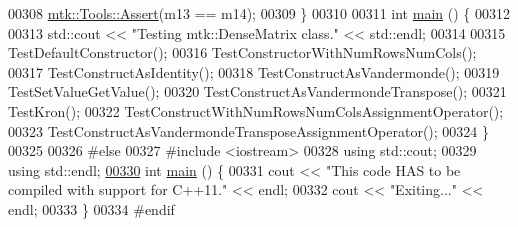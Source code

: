 \begin{DoxyCode}
00308   \hyperlink{classmtk_1_1Tools_ac6804df469c94ab6a796fb64f1e44a89}{mtk::Tools::Assert}(m13 == m14);
00309 \}
00310 
00311 \textcolor{keywordtype}{int} \hyperlink{mtk__dense__matrix__test_8cc_ae66f6b31b5ad750f1fe042a706a4e3d4}{main} () \{
00312 
00313   std::cout << \textcolor{stringliteral}{"Testing mtk::DenseMatrix class."} << std::endl;
00314 
00315   TestDefaultConstructor();
00316   TestConstructorWithNumRowsNumCols();
00317   TestConstructAsIdentity();
00318   TestConstructAsVandermonde();
00319   TestSetValueGetValue();
00320   TestConstructAsVandermondeTranspose();
00321   TestKron();
00322   TestConstructWithNumRowsNumColsAssignmentOperator();
00323   TestConstructAsVandermondeTransposeAssignmentOperator();
00324 \}
00325 
00326 \textcolor{preprocessor}{#else}
00327 \textcolor{preprocessor}{#include <iostream>}
00328 \textcolor{keyword}{using} std::cout;
00329 \textcolor{keyword}{using} std::endl;
\hypertarget{mtk__dense__matrix__test_8cc_source_l00330}{}\hyperlink{mtk__dense__matrix__test_8cc_ae66f6b31b5ad750f1fe042a706a4e3d4}{00330} \textcolor{keywordtype}{int} \hyperlink{mtk__dense__matrix__test_8cc_ae66f6b31b5ad750f1fe042a706a4e3d4}{main} () \{
00331   cout << \textcolor{stringliteral}{"This code HAS to be compiled with support for C++11."} << endl;
00332   cout << \textcolor{stringliteral}{"Exiting..."} << endl;
00333 \}
00334 \textcolor{preprocessor}{#endif}
\end{DoxyCode}
